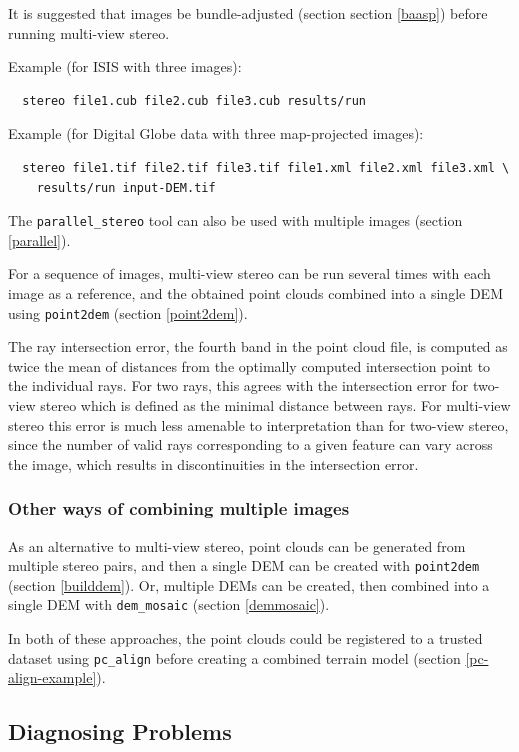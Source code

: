 It is suggested that images be bundle-adjusted (section section
\ref{baasp}) before running multi-view stereo.

Example (for ISIS with three images):
\begin{verbatim}
  stereo file1.cub file2.cub file3.cub results/run
\end{verbatim}

Example (for Digital Globe data with three map-projected images):
\begin{verbatim}
  stereo file1.tif file2.tif file3.tif file1.xml file2.xml file3.xml \
    results/run input-DEM.tif
\end{verbatim}

The \texttt{parallel\_stereo} tool can also be used with multiple images
(section \ref{parallel}).

For a sequence of images, multi-view stereo can be run several times
with each image as a reference, and the obtained point clouds combined
into a single DEM using \texttt{point2dem} (section \ref{point2dem}).

The ray intersection error, the fourth band in the point cloud
file, is computed as twice the mean of distances from the optimally
computed intersection point to the individual rays. For two rays, this
agrees with the intersection error for two-view stereo which is defined
as the minimal distance between rays. For multi-view stereo this error
is much less amenable to interpretation than for two-view stereo, since the
number of valid rays corresponding to a given feature can vary across
the image, which results in discontinuities in the intersection error.

\subsubsection*{Other ways of combining multiple images}

As an alternative to multi-view stereo, point clouds can be generated
from multiple stereo pairs, and then a single DEM can be created with
\texttt{point2dem} (section \ref{builddem}). Or, multiple DEMs
can be created, then combined into a single DEM with \texttt{dem\_mosaic}
(section \ref{demmosaic}).

In both of these approaches, the point clouds could be registered
to a trusted dataset using \texttt{pc\_align} before creating a combined
terrain model (section \ref{pc-align-example}).

\subsection{Diagnosing Problems}

